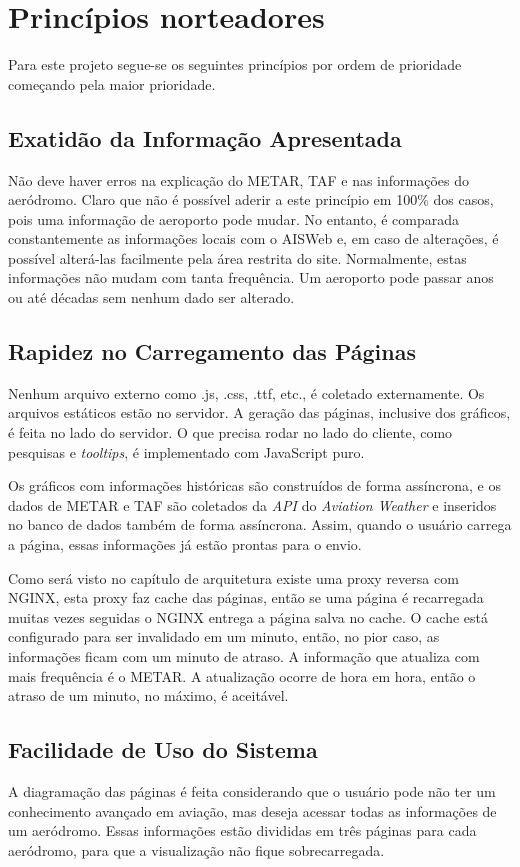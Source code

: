 \chapter{Princípios norteadores}

Para este projeto segue-se os seguintes princípios por ordem de prioridade começando
pela maior prioridade.

\section{Exatidão da Informação Apresentada}
Não deve haver erros na explicação do METAR, TAF e nas informações do aeródromo. 
Claro que não é possível aderir a este princípio em 100\% dos casos, pois uma 
informação de aeroporto pode mudar. No entanto, é comparada constantemente as 
informações locais com o AISWeb e, em caso de alterações, é possível alterá-las 
facilmente pela área restrita do site. Normalmente, estas informações não 
mudam com tanta frequência. Um aeroporto pode passar anos ou até décadas sem
nenhum dado ser alterado.

\section{Rapidez no Carregamento das Páginas} Nenhum arquivo externo como .js, 
.css, .ttf, etc., é coletado externamente. Os arquivos estáticos estão no servidor. 
A geração das páginas, inclusive dos gráficos, é feita no lado do servidor. O que 
precisa rodar no lado do cliente, como pesquisas e \textit{tooltips}, é implementado com 
JavaScript puro.

Os gráficos com informações históricas são construídos de forma assíncrona, e os
dados de METAR e TAF são coletados da \textit{API} do \textit{Aviation Weather} e inseridos no
banco de dados também de forma assíncrona. Assim, quando o usuário carrega a 
página, essas informações já estão prontas para o envio.

Como será visto no capítulo de arquitetura existe uma proxy reversa com NGINX,
esta proxy faz cache das páginas, então se uma página é recarregada muitas vezes
seguidas o NGINX entrega a página salva no cache. O cache está configurado para
ser invalidado em um minuto, então, no pior caso, as informações ficam com um 
minuto de atraso. A informação que atualiza com mais frequência é o METAR. A
atualização ocorre de hora em hora, então o atraso de um minuto, no máximo, é
aceitável.

\section{Facilidade de Uso do Sistema} A diagramação das páginas é feita
considerando que o usuário pode não ter um conhecimento avançado em aviação, mas
deseja acessar todas as informações de um aeródromo. Essas informações estão 
divididas em três páginas para cada aeródromo, para que a visualização não fique 
sobrecarregada.